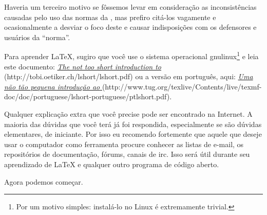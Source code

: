 Haveria um terceiro motivo se fôssemos levar em consideração as inconsistências causadas pelo uso das normas da , mas prefiro citá-los vagamente e ocasionalmente a desviar o foco deste e causar indisposições com os defensores e usuários da ``norma''.

Para aprender \LaTeX{}, sugiro que você use o sistema operacional \gls{gnulinux}\footnote{Por um motivo simples: instalá-lo no Linux é extremamente trivial.} e leia este documento: \href{http://tobi.oetiker.ch/lshort/lshort.pdf}{\emph{The not too short introduction to \LaTeXe{}}} ({\sf http://to\-bi.oeti\-ker.ch/l\-short/l\-short.pdf}) ou a versão em português, aqui: \href{http://www.tug.org/texlive/Contents/live/texmf-doc/doc/portuguese/lshort-portuguese/ptlshort.pdf}{\emph{Uma não tão pequena introdução ao \LaTeXe}} ({\sf http://www.tug.org/tex\-live/Con\-ten\-ts/li\-ve/tex\-mf-doc/doc/por\-tu\-gue\-se/l\-short-por\-tu\-gue\-se/pt\-l\-short.pdf}).

Qualquer explicação extra que você precise pode ser encontrado na Internet. A maioria das dúvidas que você terá já foi respondida, especialmente se são dúvidas elementares, de iniciante. Por isso eu recomendo fortemente que aquele que deseje usar o computador como ferramenta procure conhecer as listas de e-mail, os repositórios de documentação, fórums, canais de \gls{irc}. Isso será útil durante seu aprendizado de \LaTeX{} e qualquer outro programa de código aberto.

Agora podemos começar.
